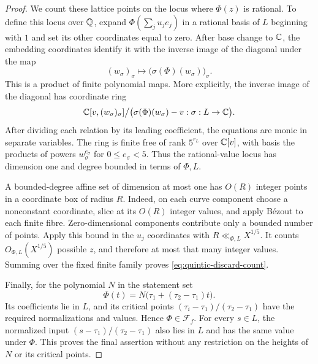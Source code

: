 \begin{proof}
We count these lattice points on the locus where $\Phi(z)$ is rational.
To define this locus over $\mathbb Q$, expand $\Phi(\sum_j u_je_j)$ in a
rational basis of $L$ beginning with $1$ and set its other coordinates
equal to zero.  After base change to $\mathbb C$, the embedding coordinates
identify it with the inverse image of the diagonal under the map
\[
 (w_\sigma)_\sigma\longmapsto
             \bigl(\sigma(\Phi)(w_\sigma)\bigr)_\sigma.
\]
This is a product of finite polynomial maps.  More explicitly, the
inverse image of the diagonal has coordinate ring
\[
 \mathbb C[v,(w_\sigma)_\sigma]\big/
       \bigl(\sigma(\Phi)(w_\sigma)-v:\sigma:L\to\mathbb C\bigr).
\]
After dividing each relation by its leading coefficient, the equations
are monic in separate variables.  The ring is finite free of rank
$5^{r_L}$ over $\mathbb C[v]$, with basis the products of powers
$w_\sigma^{e_\sigma}$ for $0\le e_\sigma<5$.
Thus the rational-value locus has dimension one and degree bounded in
terms of $\Phi,L$.

A bounded-degree affine set of dimension at most one has $O(R)$ integer
points in a coordinate box of radius $R$.  Indeed, on each curve
component choose a nonconstant coordinate, slice at its $O(R)$ integer
values, and apply B\'ezout to each finite fibre.  Zero-dimensional
components contribute only a bounded number of points.  Apply this
bound in the $u_j$ coordinates with $R\ll_{\Phi,L}X^{1/5}$.  It counts
$O_{\Phi,L}(X^{1/5})$ possible $z$, and therefore at most that many
integer values.  Summing over the fixed finite family proves
\eqref{eq:quintic-discard-count}.

Finally, for the polynomial $N$ in the statement set
\[
 \Phi(t)=N\bigl(\tau_1+(\tau_2-\tau_1)t\bigr).
\]
Its coefficients lie in $L$, and its critical points
$(\tau_i-\tau_1)/(\tau_2-\tau_1)$ have the required normalizations
and values.  Hence $\Phi\in\mathcal F_f$.  For every $s\in L$, the
normalized input $(s-\tau_1)/(\tau_2-\tau_1)$ also lies in $L$ and has
the same value under $\Phi$.  This proves the final assertion without
any restriction on the heights of $N$ or its critical points.
\end{proof}
